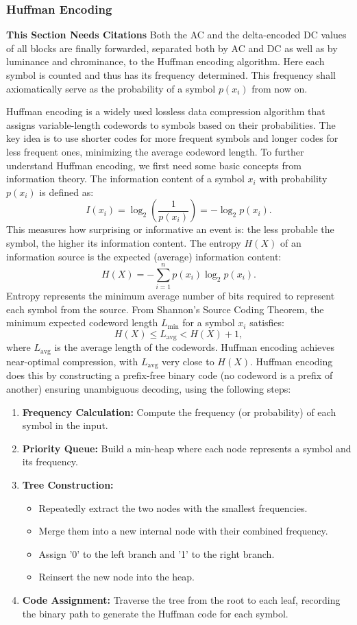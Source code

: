 \subsubsection{Huffman Encoding}

\textbf{This Section Needs Citations}
Both the AC and the delta-encoded DC values of all blocks are finally forwarded, separated both by AC and DC as well as by luminance and chrominance, to the Huffman encoding algorithm. Here each symbol is counted and thus has its frequency determined. This frequency shall axiomatically serve as the probability of a symbol \(p(x_i)\) from now on.

Huffman encoding is a widely used lossless data compression algorithm that assigns variable-length codewords to symbols based on their probabilities. The key idea is to use shorter codes for more frequent symbols and longer codes for less frequent ones, minimizing the average codeword length. To further understand Huffman encoding, we first need some basic concepts from information theory. 
The information content\cite{sha48}\cite{Riley} of a symbol \( x_i \) with probability \( p(x_i) \) is defined as:
\[
I(x_i) = \log_2 \left( \frac{1}{p(x_i)} \right) = -\log_2 p(x_i).
\]
This measures how surprising or informative an event is: the less probable the symbol, the higher its information content.
The entropy \( H(X) \) of an information source is the expected (average) information content:
\[
H(X) = -\sum_{i=1}^{n} p(x_i) \log_2 p(x_i).
\]
Entropy represents the minimum average number of bits required to represent each symbol from the source.
From Shannon's Source Coding Theorem, the minimum expected codeword length \( L_{\text{min}} \) for a symbol \( x_i \) satisfies:
\[
H(X) \leq L_{\text{avg}} < H(X) + 1,
\]
where \( L_{\text{avg}} \) is the average length of the codewords. Huffman encoding achieves near-optimal compression, with \( L_{\text{avg}} \) very close to \( H(X) \).
Huffman encoding does this by constructing a prefix-free binary code (no codeword is a prefix of another) ensuring unambiguous decoding, using the following steps:
\begin{enumerate}
	\item \textbf{Frequency Calculation:} Compute the frequency (or probability) of each symbol in the input.
	\item \textbf{Priority Queue:} Build a min-heap where each node represents a symbol and its frequency.
	\item \textbf{Tree Construction:}  
	\begin{itemize}
		\item Repeatedly extract the two nodes with the smallest frequencies.
		\item Merge them into a new internal node with their combined frequency.
		\item Assign '0' to the left branch and '1' to the right branch.
		\item Reinsert the new node into the heap.
	\end{itemize}
	\item \textbf{Code Assignment:} Traverse the tree from the root to each leaf, recording the binary path to generate the Huffman code for each symbol.
\end{enumerate}

